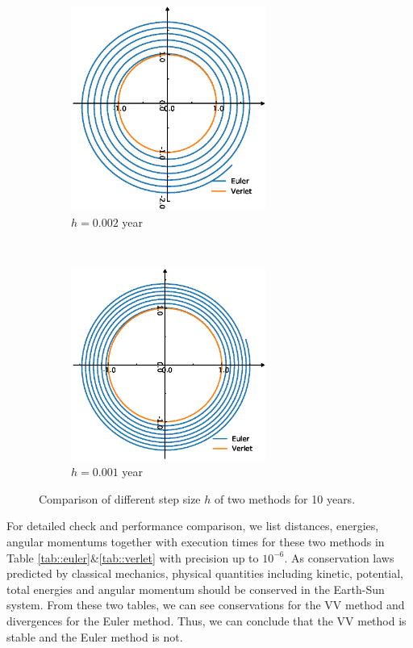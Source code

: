 \begin{figure}[tb]
\begin{subfigure}[tb]{0.5\textwidth}
		\includegraphics[width=0.7\textwidth]{Earth5000.eps}		\caption{$h = 0.002$ year}
		\label{fig:earth5000}
	\end{subfigure}
~
	\begin{subfigure}[tb]{0.5\textwidth}
		\centering
		\includegraphics[width=0.7\textwidth]{Earth10000.eps}		\caption{$h = 0.001$ year}
		\label{fig:earth10000}
	\end{subfigure}
	\caption{Comparison of different step size $h$ of two methods for 10 years. }
	\label{fig::earth}
\end{figure}

 For detailed check and performance comparison, we list distances, energies, angular momentums together with execution times for these two methods in Table \ref{tab::euler}\&\ref{tab::verlet} with precision up to $10^{-6}$.
 As conservation laws predicted by classical mechanics, physical quantities including kinetic, potential, total energies and angular momentum should be conserved in the Earth-Sun system. 
 From these two tables, we can see conservations for the VV method and divergences for the Euler method. 
 Thus, we can conclude that the VV method is stable and the Euler method is not.
 

